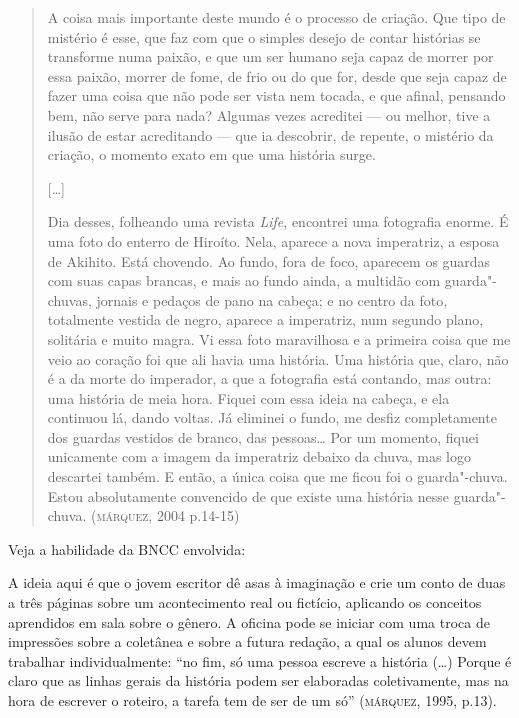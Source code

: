 \documentclass[11pt]{extarticle}
\begin{document}
\begin{quote}
A coisa mais importante deste mundo é o processo de criação. Que tipo de
mistério é esse, que faz com que o simples desejo de contar histórias se
transforme numa paixão, e que um ser humano seja capaz de morrer por
essa paixão, morrer de fome, de frio ou do que for, desde que seja capaz
de fazer uma coisa que não pode ser vista nem tocada, e que afinal,
pensando bem, não serve para nada? Algumas vezes acreditei --- ou
melhor, tive a ilusão de estar acreditando --- que ia descobrir, de
repente, o mistério da criação, o momento exato em que uma história
surge.

{[}\ldots{}{]}

Dia desses, folheando uma revista \emph{Life}, encontrei uma fotografia
enorme. É uma foto do enterro de Hiroíto. Nela, aparece a nova
imperatriz, a esposa de Akihito. Está chovendo. Ao fundo, fora de foco,
aparecem os guardas com suas capas brancas, e mais ao fundo ainda, a
multidão com guarda"-chuvas, jornais e pedaços de pano na cabeça; e no
centro da foto, totalmente vestida de negro, aparece a imperatriz, num
segundo plano, solitária e muito magra. Vi essa foto maravilhosa e a
primeira coisa que me veio ao coração foi que ali havia uma história.
Uma história que, claro, não é a da morte do imperador, a que a
fotografia está contando, mas outra: uma história de meia hora. Fiquei
com essa ideia na cabeça, e ela continuou lá, dando voltas. Já eliminei
o fundo, me desfiz completamente dos guardas vestidos de branco, das
pessoas\ldots{} Por um momento, fiquei unicamente com a imagem da imperatriz
debaixo da chuva, mas logo descartei também. E então, a única coisa que
me ficou foi o guarda"-chuva. Estou absolutamente convencido de que
existe uma história nesse guarda"-chuva. (\textsc{márquez}, 2004 p.14-15)
\end{quote}

Veja a habilidade da BNCC envolvida:

A ideia aqui é que o jovem escritor dê asas à imaginação e crie um conto
de duas a três páginas sobre um acontecimento real ou fictício,
aplicando os conceitos aprendidos em sala sobre o gênero. A oficina pode
se iniciar com uma troca de impressões sobre a coletânea e sobre a
futura redação, a qual os alunos devem trabalhar individualmente: ``no
fim, só uma pessoa escreve a história (\ldots{}) Porque é claro que as linhas
gerais da história podem ser elaboradas coletivamente, mas na hora de
escrever o roteiro, a tarefa tem de ser de um só'' (\textsc{márquez}, 1995,
p.13).
\end{document}
